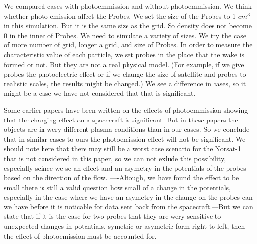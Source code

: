 

We compared cases with photoemmission and without photoemmission. We think whether photo emission affect the Probes.
We set the size of the Probes to 1 $cm^3$ in this simulation. But it is the same size as the grid.
So density does not become 0 in the inner of Probes. We need to simulate a variety of sizes.
We try the case of more number of grid, longer a grid, and size of Probes.
In order to measure the characteristic value of each particle, we set probes in the
place that the wake is formed or not. But they are not a real physical model.
(For example, if we give probes the photoelectric effect or if we change the size
of satellite and probes to realistic scales, the results might be changed.)
We see a difference in cases, so it might be a case we have not considered that that is significant.

Some earlier papers have been written on the effects of photoemmission showing that the charging effect 
on a spacecraft is significant.\citep{Ergun} But in these papers the objects are in wery different
plasma conditions than in our cases. So we conclude that in similar cases to ours the photoemission effect
will not be significant. We should note here that there may still be a worst case scenario for the Norsat-1
that is not considered in this paper, so we can not exlude this possibility, especially scince we se an effect and an
asymetry in the potentials of the probes based on the direction of the flow. ----Altough, we have found the effect to be small 
there is still a valid question how small of a change in the potentials, especially in the case where we have an asymetry in
the change on the probes can we have before it is noticable for data sent back from the spacecraft.---But we can state that if 
it is the case for two probes that they are wery sensitive to unexpected changes in potentials, symetric or asymetric form 
right to left, then the effect of photoemission must be accounted for.